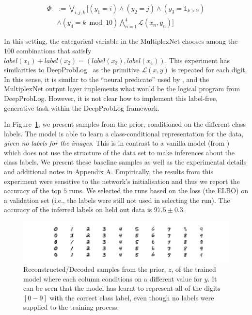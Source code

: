 \documentclass[letterpaper]{article} %
\begin{document}
\begin{equation}
    \begin{split}
    \label{eq:mnist_domain_knowledge}
    \Phi &:= \bigvee_{i,j,k} \Big[ ( y_1 = i ) \land ( y_2 = j ) \land ( y_3 = \mathds{1}_{k>9} ) \\
         & \land ( y_4 = k \bmod 10 ) \bigwedge\limits_{n=1}^4 \mathcal{L}(x_n, y_n) \Big]
    \end{split}
\end{equation}

In this setting, the categorical variable in the MultiplexNet chooses among the $100$ combinations that satisfy $label(x_1) + label(x_2) = (label(x_3), label(x_4))$.
This experiment has similarities to DeepProbLog~\citep{manhaeve2018deepproblog} as the primitive $\mathcal{L}(x, y)$ is repeated for each digit.
In this sense, it is similar to the ``neural predicate'' used by \citet{manhaeve2018deepproblog}, and the MultiplexNet output layer implements what would be the logical program from DeepProbLog.
However, it is not clear how to implement this label-free, generative task within the DeepProbLog framework.

In Figure~\ref{fig:mnist_prior_samples}, we present samples from the prior, conditioned on the different class labels.
The model is able to learn a class-conditional representation for the data, \textit{given no labels for the images}.
This is in contrast to a vanilla model (from \citet{kingma2014semi}) which does not use the structure of the data set to make inferences about the class labels.
We present these baseline samples as well as the experimental details and additional notes in Appendix A.
Empirically, the results from this experiment were sensitive to the network's initialisation and thus we report the accuracy of the top $5$ runs.
We selected the runs based on the loss (the ELBO) on a validation set
(i.e., the labels were still not used in selecting the run).
The accuracy of the inferred labels on held out data is $97.5 \pm 0.3$.

\begin{figure}
  \centering
  \includegraphics[width=.5\textwidth]{images/mnist_samples_from_prior.png}
  \caption{Reconstructed/Decoded samples from the prior, $z$, of the trained model where each column conditions on a different value for $y$. It can be seen that the model has learnt to represent all of the digits $[0-9]$  with the correct class label, even though no labels were supplied to the training process.}
  \label{fig:mnist_prior_samples}
\end{figure}
\end{document}
